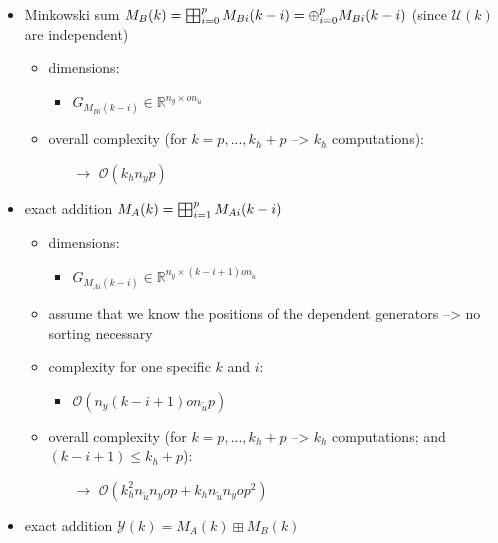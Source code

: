 \documentclass{article}
\begin{document}
\begin{itemize}
\begin{itemize}
\begin{itemize}
        \end{itemize}
    \end{itemize}
    \item Minkowski sum $M_B(k) = \bigboxplus_{i=0}^p M_{Bi}(k-i) = \oplus_{i=0}^p M_{Bi}(k-i)$ (since $\mathcal{U}(k)$ are independent)    
    \begin{itemize}
        \item dimensions:
        \begin{itemize}
            \item $G_{M_{Bi}(k-i)} \in \mathbb{R}^{n_{y} \times o n_{\tilde{u}}}$ 
        \end{itemize}
        \item overall complexity (for $k=p,...,k_h+p$ --> $k_h$ computations):
        \begin{itemize}
            \item[$\rightarrow$] $\mathcal{O}(k_h n_y p)$
        \end{itemize}
    \end{itemize}
    \item exact addition $M_{A}(k) = \bigboxplus_{i=1}^p M_{Ai}(k-i)$    
    \begin{itemize}
        \item dimensions:
        \begin{itemize}          
            \item $G_{M_{Ai}(k-i)} \in \mathbb{R}^{n_{y} \times (k-i+1)o n_{\tilde{u}}}$    
        \end{itemize}
        \item assume that we know the positions of the dependent generators --> no sorting necessary
        \item complexity for one specific $k$ and $i$:
        \begin{itemize}
            \item $\mathcal{O}(n_{y} (k-i+1) o n_{\tilde{u}} p)$
        \end{itemize}
        \item overall complexity (for $k=p,...,k_h+p$ --> $k_h$ computations; and $(k-i+1)\leq k_h+p$):
        \begin{itemize}
            \item[$\rightarrow$] $\mathcal{O}(k_h^2 n_{\tilde{u}} n_{y} o p + k_h n_{\tilde{u}} n_{y} o p^2)$
        \end{itemize}
    \end{itemize}
    \item exact addition $\mathcal{Y}(k) = M_{A}(k) \boxplus M_{B}(k)$    

\end{itemize}
\end{document}
